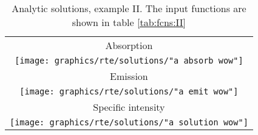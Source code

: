 \begin{table}[htbp]
\caption[Analytic solutions, example II]{Analytic solutions, example II. The input functions are shown in table \eqref{tab:fcns:II}}
\begin{center}
\begin{tabular}{c}
%
Absorption \\
\texttt{[image: graphics/rte/solutions/"a absorb wow"]} \\[10pt]
%
Emission \\
\texttt{[image: graphics/rte/solutions/"a emit wow"]} \\[10pt]
%
Specific intensity \\
\texttt{[image: graphics/rte/solutions/"a solution wow"]} \\
%
%
\end{tabular}
\end{center}
\label{rte:solutions II}
\end{table}%


\endinput %